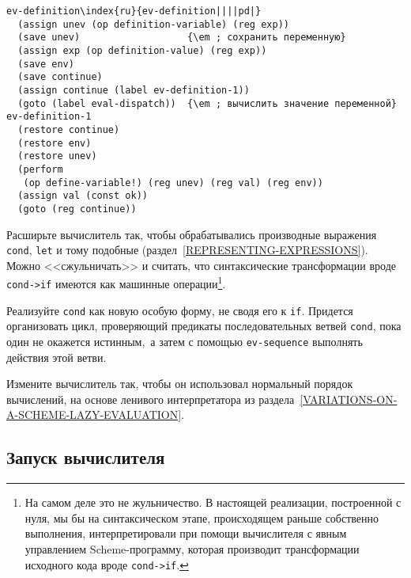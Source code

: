 \begin{Verbatim}[fontsize=\small]
ev-definition\index{ru}{ev-definition||||pd|}
  (assign unev (op definition-variable) (reg exp))
  (save unev)                   {\em ; сохранить переменную}
  (assign exp (op definition-value) (reg exp))
  (save env)
  (save continue)
  (assign continue (label ev-definition-1))
  (goto (label eval-dispatch))  {\em ; вычислить значение переменной}
ev-definition-1
  (restore continue)
  (restore env)
  (restore unev)
  (perform
   (op define-variable!) (reg unev) (reg val) (reg env))
  (assign val (const ok))
  (goto (reg continue))
\end{Verbatim}
\begin{exercise}{5.23}%
\label{EX5.23}%
Расширьте вычислитель так, чтобы обрабатывались
производные выражения {\tt cond}, {\tt let} и тому
подобные (раздел~\ref{REPRESENTING-EXPRESSIONS}).  Можно
<<сжульничать>> и считать, что синтаксические трансформации вроде
{\tt cond->if} имеются как машинные операции\footnote{На самом деле это не жульничество.  В настоящей
реализации, построенной с нуля, мы бы на
синтаксическом этапе, происходящем раньше собственно выполнения,
интерпретировали при помощи
вычислителя с явным управлением Scheme-программу, которая производит
трансформации исходного кода вроде {\tt cond->if}.
}.
\end{exercise}
\begin{exercise}{5.24}%
\label{EX5.24}%
Реализуйте {\tt cond} как новую  особую форму, не сводя его к 
{\tt if}.  Придется организовать цикл, проверяющий
предикаты последовательных ветвей {\tt cond}, пока один не
окажется истинным,~а затем с помощью {\tt ev-sequence}
выполнять действия этой ветви.
\end{exercise}
\begin{exercise}{5.25}%
\label{EX5.25}%
Измените вычислитель так, чтобы он использовал
нормальный порядок вычислений, на основе ленивого интерпретатора из
раздела~\ref{VARIATIONS-ON-A-SCHEME-LAZY-EVALUATION}.
\end{exercise}

\subsection{Запуск вычислителя}
\label{RUNNING-THE-EVALUATOR}


